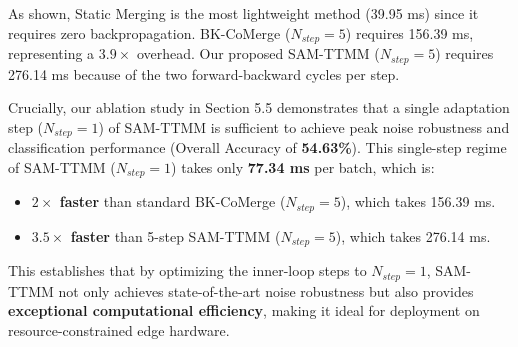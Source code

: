 \documentclass{article}
\theoremstyle{plain}
\theoremstyle{definition}
\theoremstyle{remark}
\begin{document}
As shown, Static Merging is the most lightweight method (39.95 ms) since it requires zero backpropagation. BK-CoMerge ($N_{step}=5$) requires 156.39 ms, representing a $3.9\times$ overhead. Our proposed SAM-TTMM ($N_{step}=5$) requires 276.14 ms because of the two forward-backward cycles per step.

Crucially, our ablation study in Section 5.5 demonstrates that a single adaptation step ($N_{step}=1$) of SAM-TTMM is sufficient to achieve peak noise robustness and classification performance (Overall Accuracy of \textbf{54.63\%}).
This single-step regime of SAM-TTMM ($N_{step}=1$) takes only \textbf{77.34 ms} per batch, which is:
\begin{itemize}
    \item \textbf{$2\times$ faster} than standard BK-CoMerge ($N_{step}=5$), which takes 156.39 ms.
    \item \textbf{$3.5\times$ faster} than 5-step SAM-TTMM ($N_{step}=5$), which takes 276.14 ms.
\end{itemize}
This establishes that by optimizing the inner-loop steps to $N_{step}=1$, SAM-TTMM not only achieves state-of-the-art noise robustness but also provides \textbf{exceptional computational efficiency}, making it ideal for deployment on resource-constrained edge hardware.
\end{document}
